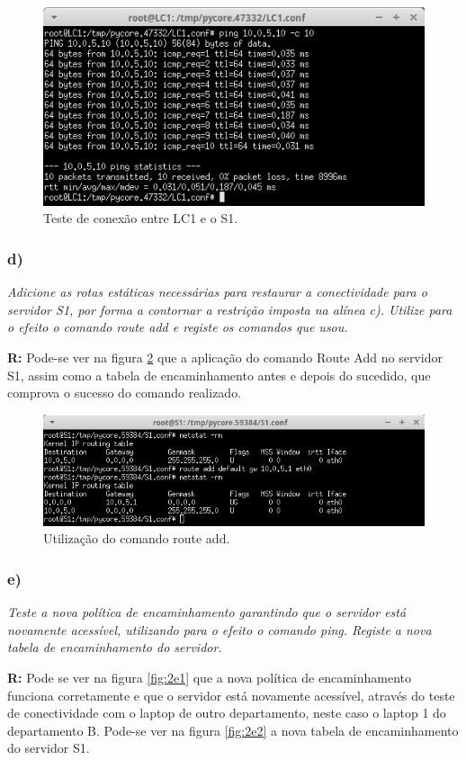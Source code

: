 \documentclass{llncs}
\begin{document}
\begin{figure}[H]
\begin{center}
\includegraphics[scale=0.60]{2c_3.png} 
\end{center}
\caption{\label{fig:2c_3} Teste de conexão entre LC1 e o S1.}
\end{figure}

\subsubsection{d)}
\emph{Adicione as rotas estáticas necessárias para restaurar a conectividade para o servidor S1, por forma a contornar a restrição imposta na alínea c). Utilize para o efeito o comando route add e registe os comandos que usou.}
\\ \par
\textbf{R:} Pode-se ver na figura \ref{fig:2d} que a aplicação do comando Route Add no servidor S1, assim como a tabela de encaminhamento antes e depois do sucedido, que comprova o sucesso do comando realizado.

\begin{figure}[H]
\begin{center}
\includegraphics[scale=0.60]{2d.png} 
\end{center}
\caption{\label{fig:2d} Utilização do comando route add.}
\end{figure}

\subsubsection{e)}
\emph{Teste a nova política de encaminhamento garantindo que o servidor está novamente acessível, utilizando para o efeito o comando ping. Registe a nova tabela de encaminhamento do servidor.}
\\ \par
\textbf{R:} Pode se ver na figura \ref{fig:2e1} que a nova política de encaminhamento funciona corretamente e que o servidor está novamente acessível, através do teste de conectividade com o laptop de outro departamento, neste caso o laptop 1 do departamento B.
Pode-se ver na figura \ref{fig:2e2} a nova tabela de encaminhamento do servidor S1.
\end{document}

